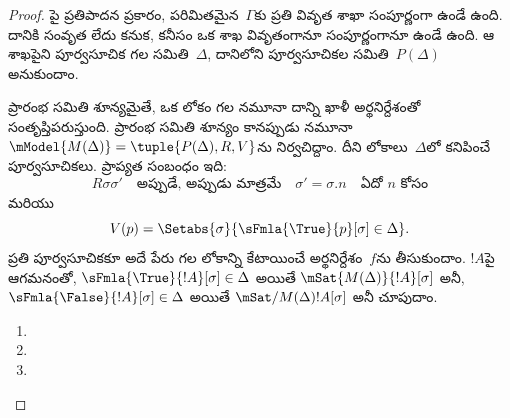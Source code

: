 \documentclass[../../../include/open-logic-section]{subfiles}
\begin{document}
\begin{proof}
పై ప్రతిపాదన ప్రకారం, పరిమితమైన~$\Gamma$కు ప్రతి వివృత శాఖా
సంపూర్ణంగా ఉండే  ఉంది.
దానికి సంవృత  లేదు కనుక,
కనీసం ఒక శాఖ వివృతంగానూ సంపూర్ణంగానూ ఉండే
 ఉంది. ఆ శాఖపైని పూర్వసూచిక
గల  సమితి~$\Delta$,
దానిలోని పూర్వసూచికల సమితి~$P(\Delta)$ అనుకుందాం.

ప్రారంభ సమితి శూన్యమైతే, ఒక లోకం గల నమూనా దాన్ని
ఖాళీ అర్థనిర్దేశంతో సంతృప్తిపరుస్తుంది. ప్రారంభ సమితి శూన్యం కానప్పుడు
నమూనా~$\mModel{M(\Delta)} = \tuple{P(\Delta), R, V}$ను
నిర్వచిద్దాం. దీని లోకాలు~$\Delta$లో కనిపించే పూర్వసూచికలు.
ప్రాప్యత సంబంధం ఇది:
\[
R\sigma\sigma' \quad \text{అప్పుడే, అప్పుడు మాత్రమే} \quad
\sigma'=\sigma.n \quad \text{ఏదో~$n$ కోసం}
\]
మరియు
\[
V(p) = \Setabs{\sigma}{\sFmla{\True}{p}[\sigma] \in \Delta}.
\]
ప్రతి పూర్వసూచికకూ అదే పేరు గల లోకాన్ని కేటాయించే
అర్థనిర్దేశం~$f$ను తీసుకుందాం.
$!A$పై ఆగమనంతో, $\sFmla{\True}{!A}[\sigma] \in \Delta$
అయితే $\mSat{M(\Delta)}{!A}[\sigma]$ అనీ,
$\sFmla{\False}{!A}[\sigma] \in \Delta$ అయితే
$\mSat/{M(\Delta)}{!A}[\sigma]$ అనీ చూపుదాం.

\begin{enumerate}
  \item {}
  \item {}
  \item {}
\end{enumerate}
\end{proof}
\end{document}
